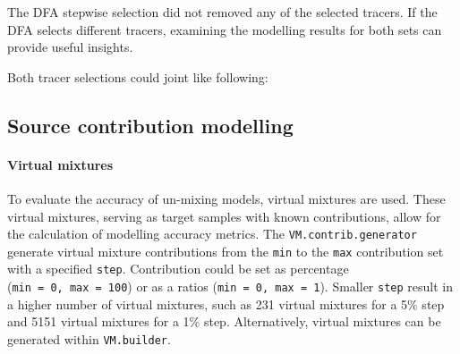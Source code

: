 \documentclass[
]{article}
\newenvironment{Shaded}{\begin{snugshade}}{\end{snugshade}}
\newcommand{\CommentTok}[1]{\textcolor[rgb]{0.56,0.35,0.01}{\textit{#1}}}
\newcommand{\FunctionTok}[1]{\textcolor[rgb]{0.13,0.29,0.53}{\textbf{#1}}}
\newcommand{\NormalTok}[1]{#1}
\newcommand{\OtherTok}[1]{\textcolor[rgb]{0.56,0.35,0.01}{#1}}
\newcommand{\SpecialCharTok}[1]{\textcolor[rgb]{0.81,0.36,0.00}{\textbf{#1}}}
\newcommand{\StringTok}[1]{\textcolor[rgb]{0.31,0.60,0.02}{#1}}
\begin{document}
The DFA stepwise selection did not removed any of the selected tracers.
If the DFA selects different tracers, examining the modelling results
for both sets can provide useful insights.

Both tracer selections could joint like following:

\begin{Shaded}
\end{Shaded}

\hypertarget{source-contribution-modelling}{%
\subsection{Source contribution
modelling}\label{source-contribution-modelling}}

\hypertarget{virtual-mixtures}{%
\paragraph{Virtual mixtures}\label{virtual-mixtures}}

To evaluate the accuracy of un-mixing models, virtual mixtures are used.
These virtual mixtures, serving as target samples with known
contributions, allow for the calculation of modelling accuracy metrics.
The \texttt{VM.contrib.generator} generate virtual mixture contributions
from the \texttt{min} to the \texttt{max} contribution set with a
specified \texttt{step}. Contribution could be set as percentage
(\texttt{min\ =\ 0,\ max\ =\ 100}) or as a ratios
(\texttt{min\ =\ 0,\ max\ =\ 1}). Smaller \texttt{step} result in a
higher number of virtual mixtures, such as 231 virtual mixtures for a
5\% step and 5151 virtual mixtures for a 1\% step. Alternatively,
virtual mixtures can be generated within \texttt{VM.builder}.
\end{document}
